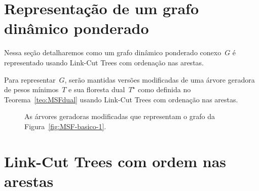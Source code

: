 \begin{comment}
\section{Link-Cut Trees}
\label{sec:linkcuttree}

Para uma introdução sobre link-cut trees, recomendamos o trabalho de~\cite{linkcuttree}.

\begin{itemize}
\item \linkcutCreate(): Cria e retorna um novo nó de link-cut tree.
\item \linkcutAddEdge($v$, $w$): Adiciona uma aresta de~$v$ a~$w$, tornando~$v$ um filho de~$w$. Essa operação assume que~$v$ é a raiz de uma árvore~$T$ e que $w$ não é um nó de~$T$.
\item \linkcutDelEdge($v$): Remove a aresta de~$v$ para seu pai.
\item \linkcutEvert($v$): Torna~$v$ a raiz de sua árvore revertendo o caminho de~$v$ para a raiz original.
\item \linkcutMax($v$): Retorna o nó de peso máximo no caminho entre~$v$ e a raiz de sua árvore.
\item \linkcutMin($v$): Retorna o nó de peso mínimo no caminho entre~$v$ e a raiz de sua árvore.
\end{itemize}
\end{comment}

\section{Representação de um grafo dinâmico ponderado}
Nessa seção detalharemos como um grafo dinâmico ponderado conexo~$G$ é representado usando Link-Cut Trees com ordenação nas arestas.



Para representar~$G$, serão mantidas versões modificadas de uma árvore geradora de pesos mínimos~$T$ e sua floresta dual~$T^\star$ como definida no Teorema~\ref{teo:MSFdual} usando Link-Cut Trees com ordenação nas arestas.

\begin{figure}[htb]
\centering

\caption{As árvores geradoras modificadas que representam o grafo da Figura~\ref{fig:MSF-basico-1}.}
\label{fig:MSF-figura-3}
\end{figure}



\section{Link-Cut Trees com ordem nas arestas}


